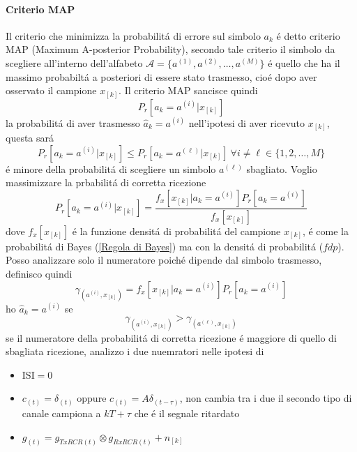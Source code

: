         \paragraph{Criterio MAP}
            Il criterio che minimizza la probabilitá di errore sul simbolo $a_k$ é detto criterio MAP (Maximum A-posterior Probability),
            secondo tale criterio il simbolo da scegliere all'interno dell'alfabeto $\mathcal{A} = \{a^{(1)},a^{(2)},\dots,a^{(M)}\}$
            é quello che ha il massimo probabiltá a posteriori di essere stato trasmesso, cioé dopo aver osservato il campione $x_{[k]}$.
            Il criterio MAP sancisce quindi 
            \[
                P_r[a_k = a^{(i)}|x_{[k]}]    
            \]
            la probabilitá di aver trasmesso $\hat{a}_{k}=a^{(i)}$ nell'ipotesi di aver ricevuto $x_{[k]}$, questa sará
            \[
                P_r[a_k = a^{(i)}|x_{[k]}] \leq P_r[a_k = a^{(\ell)}|x_{[k]}]\ \forall i\neq \ell\in \{1,2,\dots,M\}    
            \]
            é minore della probabilitá di scegliere un simbolo $a^{(\ell)}$ sbagliato. Voglio massimizzare la prbabilitá di 
            corretta ricezione 
            \[
                P_r[a_k = a^{(i)}|x_{[k]}] = \frac{f_x[x_{[k]}|a_k = a^{(i)}]P_r[a_k = a^{(i)}]}{f_x[x_{[k]}]}    
            \]
            dove $f_x[x_{[k]}]$ é la funzione densitá di probabilitá del campione $x_{[k]}$,
            é come la probabilitá di Bayes (\ref{Regola di Bayes}) ma con la densitá di probabilitá ($fdp$). Posso analizzare
            solo il numeratore poiché dipende dal simbolo trasmesso, definisco quindi 
            \[
                \gamma_{(a^{(i)},x_{[k]})} = f_x[x_{[k]}|a_k = a^{(i)}]P_r[a_k = a^{(i)}]
            \] 
            ho $\hat{a}_k = a^{(i)}$ se 
            \[
                \gamma_{(a^{(i)},x_{[k]})} > \gamma_{(a^{(\ell)},x_{[k]})}
            \]
            se il numeratore della probabilitá di corretta ricezione é maggiore di quello di sbagliata ricezione, 
            analizzo i due nuemratori nelle ipotesi di 
            \begin{itemize}
                \item {ISI$=0$}
                \item {$c_{(t)} = \delta_{(t)}$ oppure $c_{(t)} = A\delta_{(t-\tau)}$, non cambia tra i due il secondo tipo di canale campiona a $kT+\tau$
                    che é il segnale ritardato}
                \item {$g_{(t)} = g_{TxRCR(t)}\otimes g_{RxRCR(t)} + n_{[k]}$}
            \end{itemize}
